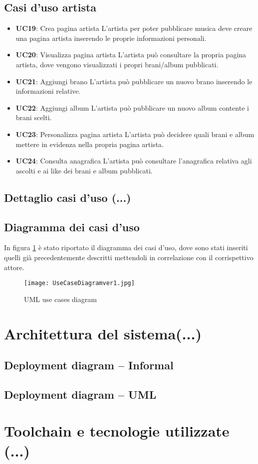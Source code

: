 \subsection{Casi d'uso artista}
\begin{itemize}
    \item \textbf{UC19}: Crea pagina artista L'artista per poter pubblicare musica deve
          creare una pagina artista inserendo le proprie informazioni personali.
    \item  \textbf{UC20}: Visualizza pagina artista L'artista può consultare la propria
          pagina artista, dove vengono visualizzati i propri brani/album pubblicati.
    \item  \textbf{UC21}: Aggiungi brano L'artista può pubblicare un nuovo brano
          inserendo le informazioni relative.
    \item  \textbf{UC22}: Aggiungi album L'artista può pubblicare un nuovo album contente
          i brani scelti.
    \item  \textbf{UC23}: Personalizza pagina artista L'artista può decidere quali brani
          e album mettere in evidenza nella propria pagina artista.
    \item  \textbf{UC24}: Consulta anagrafica L'artista può consultare l'anagrafica
          relativa agli ascolti e ai like dei brani e album pubblicati.

\end{itemize}

\subsection{Dettaglio casi d'uso (...)}

\subsection{Diagramma dei casi d'uso}
In figura \ref{fig-uml-use-cases} è stato riportato il diagramma dei casi d'uso, dove sono stati inseriti quelli
già precedentemente descritti mettendoli in correlazione con il corrispettivo attore.
\begin{figure}[h]
    \centering
    \texttt{[image: UseCaseDiagramver1.jpg]}
    \caption{UML use cases diagram}
    \label{fig-uml-use-cases}
\end{figure}

\section{Architettura del sistema(...)}

\subsection{Deployment diagram -- Informal}

\subsection{Deployment diagram -- UML}

\section{Toolchain e tecnologie utilizzate (...)}